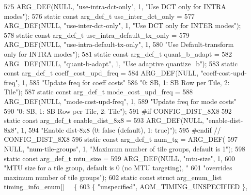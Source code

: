 \begin{DoxyCodeInclude}
{{{{{{{575     ARG\_DEF(NULL, \textcolor{stringliteral}{"use-intra-dct-only"}, 1, \textcolor{stringliteral}{"Use DCT only for INTRA modes"});
576 \textcolor{keyword}{static} \textcolor{keyword}{const} arg\_def\_t use\_inter\_dct\_only =
577     ARG\_DEF(NULL, \textcolor{stringliteral}{"use-inter-dct-only"}, 1, \textcolor{stringliteral}{"Use DCT only for INTER modes"});
578 \textcolor{keyword}{static} \textcolor{keyword}{const} arg\_def\_t use\_intra\_default\_tx\_only =
579     ARG\_DEF(NULL, \textcolor{stringliteral}{"use-intra-default-tx-only"}, 1,
580             \textcolor{stringliteral}{"Use Default-transform only for INTRA modes"});
581 \textcolor{keyword}{static} \textcolor{keyword}{const} arg\_def\_t quant\_b\_adapt =
582     ARG\_DEF(NULL, \textcolor{stringliteral}{"quant-b-adapt"}, 1, \textcolor{stringliteral}{"Use adaptive quantize\_b"});
583 \textcolor{keyword}{static} \textcolor{keyword}{const} arg\_def\_t coeff\_cost\_upd\_freq =
584     ARG\_DEF(NULL, \textcolor{stringliteral}{"coeff-cost-upd-freq"}, 1,
585             \textcolor{stringliteral}{"Update freq for coeff costs"}
586             \textcolor{stringliteral}{"0: SB, 1: SB Row per Tile, 2: Tile"});
587 \textcolor{keyword}{static} \textcolor{keyword}{const} arg\_def\_t mode\_cost\_upd\_freq =
588     ARG\_DEF(NULL, \textcolor{stringliteral}{"mode-cost-upd-freq"}, 1,
589             \textcolor{stringliteral}{"Update freq for mode costs"}
590             \textcolor{stringliteral}{"0: SB, 1: SB Row per Tile, 2: Tile"});
591 \textcolor{preprocessor}{#if CONFIG\_DIST\_8X8}
592 \textcolor{keyword}{static} \textcolor{keyword}{const} arg\_def\_t enable\_dist\_8x8 =
593     ARG\_DEF(NULL, \textcolor{stringliteral}{"enable-dist-8x8"}, 1,
594             \textcolor{stringliteral}{"Enable dist-8x8 (0: false (default), 1: true)"});
595 \textcolor{preprocessor}{#endif  // CONFIG\_DIST\_8X8}
596 \textcolor{keyword}{static} \textcolor{keyword}{const} arg\_def\_t num\_tg = ARG\_DEF(
597     NULL, \textcolor{stringliteral}{"num-tile-groups"}, 1, \textcolor{stringliteral}{"Maximum number of tile groups, default is 1"});
598 \textcolor{keyword}{static} \textcolor{keyword}{const} arg\_def\_t mtu\_size =
599     ARG\_DEF(NULL, \textcolor{stringliteral}{"mtu-size"}, 1,
600             \textcolor{stringliteral}{"MTU size for a tile group, default is 0 (no MTU targeting), "}
601             \textcolor{stringliteral}{"overrides maximum number of tile groups"});
602 \textcolor{keyword}{static} \textcolor{keyword}{const} \textcolor{keyword}{struct }arg\_enum\_list timing\_info\_enum[] = \{
603   \{ \textcolor{stringliteral}{"unspecified"}, AOM\_TIMING\_UNSPECIFIED \},
}}}}}}}
\end{DoxyCodeInclude}
